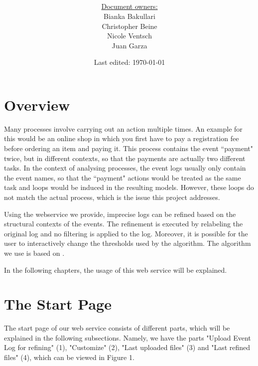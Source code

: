 \documentclass[notitlepage]{article}
\title{%
	\documentName\text{ } \\
  \large \projectName\text{ } \\
  }
\author{
	\large \underline{Document owners:}\\ 
	Bianka Bakullari\\
	\texttt{}
	Christopher Beine\\
	\texttt{}
	Nicole Ventsch\\
	\texttt{}
	Juan Garza\\
	\texttt{}
}
\date{\small{Last edited: \today}}
\begin{document}
\begin{titlepage}
\clearpage\maketitle			%
\thispagestyle{fancy}
\tableofcontents
\end{titlepage}

\rfoot{\thepage}				%


\begin{flushleft}				%

\section{Overview}

Many processes involve carrying out an action multiple times. An example for this would be an online shop in which you first have to pay a registration fee before ordering an item and paying it. This process contains the event ``payment" twice, but in different contexts, so that the payments are actually two different tasks. In the context of analysing processes, the event logs usually only contain the event names, so that the ``payment" actions would be treated as the same task and loops would be induced in the resulting models. However, these loops do not match the actual process, which is the issue this project addresses. 

Using the webservice we provide, imprecise logs can be refined based on the structural contexts of the events. The refinement is executed by relabeling the original log and no filtering is applied to the log. Moreover, it is possible for the user to interactively change the thresholds used by the algorithm. The algorithm we use is based on \cite{paper}.

In the following chapters, the usage of this web service will be explained.




\section{The Start Page}

The start page of our web service consists of different parts, which will be explained in the following subsections. Namely, we have the parts "Upload Event Log for refining" (1), "Customize" (2), "Last uploaded files" (3) and "Last refined files" (4), which can be viewed in Figure 1.


\end{flushleft}
\end{document}
